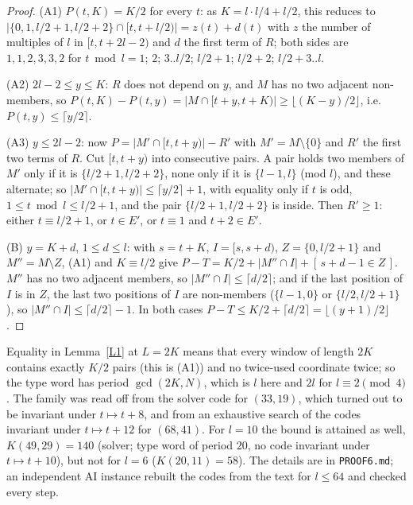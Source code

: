 \documentclass[11pt]{article}
\theoremstyle{remark}
\begin{document}
\begin{proof}
(A1) $P(t,K)=K/2$ for every $t$: as $K=l\cdot l/4+l/2$, this reduces to $|\{0,1,l/2+1,l/2+2\}\cap[t,t+l/2)|=z(t)+d(t)$ with $z$ the
number of multiples of $l$ in $[t,t+2l-2)$ and $d$ the first term of $R$; both sides are $1,1,2,3,3,2$ for
$t\bmod l=1$; $2$; $3..l/2$; $l/2+1$; $l/2+2$; $l/2+3..l$.

(A2) $2l-2\le y\le K$: $R$ does not depend on $y$, and $M$ has no two adjacent non-members, so
$P(t,K)-P(t,y)=|M\cap[t+y,t+K)|\ge\lfloor (K-y)/2\rfloor$, i.e.\ $P(t,y)\le\lceil y/2\rceil$.

(A3) $y\le 2l-2$: now $P=|M'\cap[t,t+y)|-R'$ with $M'=M\setminus\{0\}$ and $R'$ the first two terms of $R$. Cut $[t,t+y)$ into
consecutive pairs. A pair holds two members of $M'$ only if it is $\{l/2+1,l/2+2\}$, none only if it is $\{l-1,l\}$ (mod $l$),
and these alternate; so $|M'\cap[t,t+y)|\le\lceil y/2\rceil+1$, with equality only if $t$ is odd, $1\le t\bmod l\le l/2+1$, and the
pair $\{l/2+1,l/2+2\}$ is inside. Then $R'\ge1$: either $t\equiv l/2+1$, or $t\in E'$, or $t\equiv 1$ and $t+2\in E'$.

(B) $y=K+d$, $1\le d\le l$: with $s=t+K$, $I=[s,s+d)$, $Z=\{0,l/2+1\}$ and $M''=M\setminus Z$, (A1) and $K\equiv l/2$ give
$P-T=K/2+|M''\cap I|+[\,s+d-1\in Z\,]$. $M''$ has no two adjacent members, so $|M''\cap I|\le\lceil d/2\rceil$; and if the last
position of $I$ is in $Z$, the last two positions of $I$ are non-members ($\{l-1,0\}$ or $\{l/2,l/2+1\}$), so
$|M''\cap I|\le\lceil d/2\rceil-1$. In both cases $P-T\le K/2+\lceil d/2\rceil=\lfloor (y+1)/2\rfloor$.
\end{proof}
\noindent Equality in Lemma~\ref{L1} at $L=2K$ means that every window of length $2K$ contains exactly $K/2$ pairs (this is (A1)) and
no twice-used coordinate twice; so the type word has period $\gcd(2K,N)$, which is $l$ here and $2l$ for $l\equiv 2\pmod 4$. The
family was read off from the solver code for $(33,19)$, which turned out to be invariant under $t\mapsto t+8$, and from an exhaustive
search of the codes invariant under $t\mapsto t+12$ for $(68,41)$. For $l=10$ the bound is attained as well, $K(49,29)=140$
(solver; type word of period $20$, no code invariant under $t\mapsto t+10$), but not for $l=6$ ($K(20,11)=58$).
The details are in \texttt{PROOF6.md}; an independent AI instance rebuilt the codes from the text for $l\le 64$ and checked every step.
\end{document}
